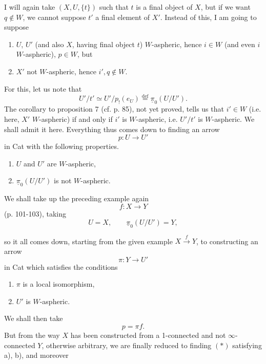 \documentclass[11pt]{article}
\newcommand{\printedpage}[1]{\marginpar{\footnotesize p.~#1}}
\newcommand{\msp}[1]{\marginpar{\footnotesize [#1]}}
\begin{document}
\setcounter{footnote}{76}

\printedpage{73}

\msp{page 105}

I will again take $(X,U,\{t\})$ such that $t$ is a final object of $X$, but if we want $q\notin W$, we cannot suppose $t'$ a final element of $X'$. Instead of this, I am going to suppose

\begin{enumerate}[label=\alph*)]
\item $U$, $U'$ (and also $X$, having final object $t$) $W$-aspheric, hence $i\in W$ (and even $i$ $W$-aspheric), $p\in W$, but
\item $X'$ not $W$-aspheric, hence $i',q\notin W$.
\end{enumerate}

For this, let us note that
\[ U'/t'\simeq U'/p_!(e_U)\overset{\text{def}}{=}\underline{\pi}_0(U/U'). \]
The corollary to proposition 7 (cf. p. 85), not yet proved, tells us that $i'\in W$ (i.e. here, $X'$ $W$-aspheric) if and only if $i'$ is $W$-aspheric, i.e. $U'/t'$ is $W$-aspheric. We shall admit it here. Everything thus comes down to finding an arrow
\[ p:U\longrightarrow U' \]
in Cat with the following properties.

\begin{enumerate}[label=\alph*)]
\item $U$ and $U'$ are $W$-aspheric,
\item $\underline{\pi}_0(U/U')$ is not $W$-aspheric.
\end{enumerate}

We shall take up the preceding example again
\[ f:X\longrightarrow Y \]
(p. 101-103), taking
\[ U=X,\qquad \underline{\pi}_0(U/U')=Y, \]

\msp{page 106}

so it all comes down, starting from the given example $X\xrightarrow{f}Y$, to constructing an arrow
\[ \pi:Y\longrightarrow U' \tag*{$(*)$} \]
in Cat which satisfies the conditions

\begin{enumerate}[label=\alph*)]
\item $\pi$ is a local isomorphism,
\item $U'$ is $W$-aspheric.
\end{enumerate}

We shall then take
\[ p=\pi f. \]
But from the way $X$ has been constructed from a 1-connected and not $\infty$-connected $Y$, otherwise arbitrary, we are finally reduced to finding $(*)$ satisfying a), b), and moreover
\end{document}
